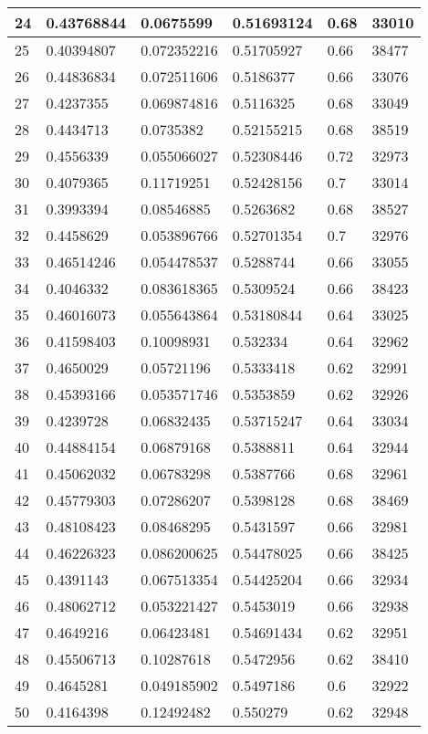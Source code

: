 \begin{longtable}{|l|l|l|l|l|l|}
24 & 0.43768844 & 0.0675599 & 0.51693124 & 0.68 & 33010 \\ \hline 
25 & 0.40394807 & 0.072352216 & 0.51705927 & 0.66 & 38477 \\ \hline 
26 & 0.44836834 & 0.072511606 & 0.5186377 & 0.66 & 33076 \\ \hline 
27 & 0.4237355 & 0.069874816 & 0.5116325 & 0.68 & 33049 \\ \hline 
28 & 0.4434713 & 0.0735382 & 0.52155215 & 0.68 & 38519 \\ \hline 
29 & 0.4556339 & 0.055066027 & 0.52308446 & 0.72 & 32973 \\ \hline 
30 & 0.4079365 & 0.11719251 & 0.52428156 & 0.7 & 33014 \\ \hline 
31 & 0.3993394 & 0.08546885 & 0.5263682 & 0.68 & 38527 \\ \hline 
32 & 0.4458629 & 0.053896766 & 0.52701354 & 0.7 & 32976 \\ \hline 
33 & 0.46514246 & 0.054478537 & 0.5288744 & 0.66 & 33055 \\ \hline 
34 & 0.4046332 & 0.083618365 & 0.5309524 & 0.66 & 38423 \\ \hline 
35 & 0.46016073 & 0.055643864 & 0.53180844 & 0.64 & 33025 \\ \hline 
36 & 0.41598403 & 0.10098931 & 0.532334 & 0.64 & 32962 \\ \hline 
37 & 0.4650029 & 0.05721196 & 0.5333418 & 0.62 & 32991 \\ \hline 
38 & 0.45393166 & 0.053571746 & 0.5353859 & 0.62 & 32926 \\ \hline 
39 & 0.4239728 & 0.06832435 & 0.53715247 & 0.64 & 33034 \\ \hline 
40 & 0.44884154 & 0.06879168 & 0.5388811 & 0.64 & 32944 \\ \hline 
41 & 0.45062032 & 0.06783298 & 0.5387766 & 0.68 & 32961 \\ \hline 
42 & 0.45779303 & 0.07286207 & 0.5398128 & 0.68 & 38469 \\ \hline 
43 & 0.48108423 & 0.08468295 & 0.5431597 & 0.66 & 32981 \\ \hline 
44 & 0.46226323 & 0.086200625 & 0.54478025 & 0.66 & 38425 \\ \hline 
45 & 0.4391143 & 0.067513354 & 0.54425204 & 0.66 & 32934 \\ \hline 
46 & 0.48062712 & 0.053221427 & 0.5453019 & 0.66 & 32938 \\ \hline 
47 & 0.4649216 & 0.06423481 & 0.54691434 & 0.62 & 32951 \\ \hline 
48 & 0.45506713 & 0.10287618 & 0.5472956 & 0.62 & 38410 \\ \hline 
49 & 0.4645281 & 0.049185902 & 0.5497186 & 0.6 & 32922 \\ \hline 
50 & 0.4164398 & 0.12492482 & 0.550279 & 0.62 & 32948 \\ \hline 
\end{longtable}